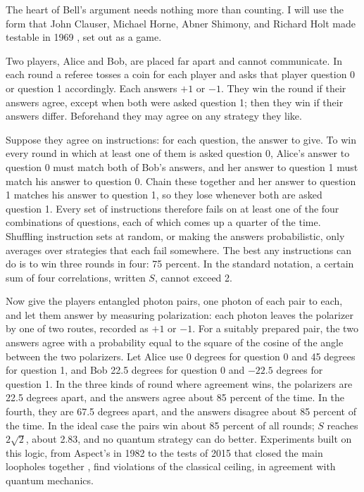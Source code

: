 The heart of Bell's argument needs nothing more than counting. I will use the form that John Clauser, Michael Horne, Abner Shimony, and Richard Holt made testable in 1969 \citep{CHSH1969}, set out as a game.

Two players, Alice and Bob, are placed far apart and cannot communicate. In each round a referee tosses a coin for each player and asks that player question 0 or question 1 accordingly. Each answers $+1$ or $-1$. They win the round if their answers agree, except when both were asked question 1; then they win if their answers differ. Beforehand they may agree on any strategy they like.

Suppose they agree on instructions: for each question, the answer to give. To win every round in which at least one of them is asked question 0, Alice's answer to question 0 must match both of Bob's answers, and her answer to question 1 must match his answer to question 0. Chain these together and her answer to question 1 matches his answer to question 1, so they lose whenever both are asked question 1. Every set of instructions therefore fails on at least one of the four combinations of questions, each of which comes up a quarter of the time. Shuffling instruction sets at random, or making the answers probabilistic, only averages over strategies that each fail somewhere. The best any instructions can do is to win three rounds in four: 75 percent. In the standard notation, a certain sum of four correlations, written $S$, cannot exceed 2.

Now give the players entangled photon pairs, one photon of each pair to each, and let them answer by measuring polarization: each photon leaves the polarizer by one of two routes, recorded as $+1$ or $-1$. For a suitably prepared pair, the two answers agree with a probability equal to the square of the cosine of the angle between the two polarizers. Let Alice use 0 degrees for question 0 and 45 degrees for question 1, and Bob 22.5 degrees for question 0 and $-22.5$ degrees for question 1. In the three kinds of round where agreement wins, the polarizers are 22.5 degrees apart, and the answers agree about 85 percent of the time. In the fourth, they are 67.5 degrees apart, and the answers disagree about 85 percent of the time. In the ideal case the pairs win about 85 percent of all rounds; $S$ reaches $2\sqrt{2}$, about 2.83, and no quantum strategy can do better. Experiments built on this logic, from Aspect's in 1982 \citep{Aspect1982} to the tests of 2015 that closed the main loopholes together \citep{Zeilinger2023Nobel}, find violations of the classical ceiling, in agreement with quantum mechanics.

